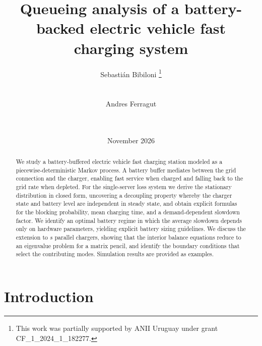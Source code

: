\documentclass{sig-alternate-per-modified}
\begin{document}

\title{Queueing analysis of a battery-backed electric vehicle fast charging system}
 
 \author{
\alignauthor Sebastián Bibiloni \thanks{This work was partially supported by ANII Uruguay under grant CF\_1\_2024\_1\_182277.}\\
		\\
		\\
 \alignauthor Andres Ferragut\\
		\\
		\\
 }	

\date{November 2026}
\maketitle

\begin{abstract}
We study a battery-buffered electric vehicle fast charging station modeled as a
piecewise-deterministic Markov process. A battery buffer mediates between the grid
connection and the charger, enabling fast service when charged and falling back to the
grid rate when depleted. For the single-server loss system we derive the stationary
distribution in closed form, uncovering a decoupling property whereby the charger state
and battery level are independent in steady state, and obtain explicit formulas for the
blocking probability, mean charging time, and a demand-dependent slowdown factor. We
identify an optimal battery regime in which the average slowdown depends only on
hardware parameters, yielding explicit battery sizing guidelines. We discuss the
extension to $s$ parallel chargers, showing that the interior balance equations reduce
to an eigenvalue problem for a matrix pencil, and identify the boundary conditions that
select the contributing modes. Simulation results are provided as examples.
\end{abstract}


\section{Introduction}
\label{sec:intro}
\end{document}
